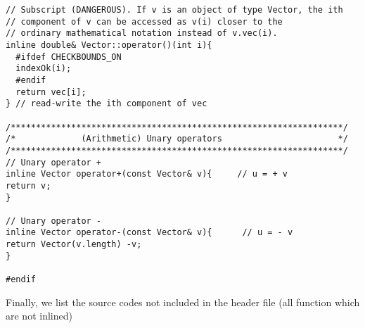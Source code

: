 \begin{lstlisting}[title={\url{http://folk.uio.no/mhjensen/compphys/programs/chapter03/cpp/Vector.h}}]
// Subscript (DANGEROUS). If v is an object of type Vector, the ith 
// component of v can be accessed as v(i) closer to the 
// ordinary mathematical notation instead of v.vec(i). 
inline double& Vector::operator()(int i){
  #ifdef CHECKBOUNDS_ON
  indexOk(i);
  #endif
  return vec[i];
} // read-write the ith component of vec

/******************************************************************/
/*             (Arithmetic) Unary operators                       */
/******************************************************************/
// Unary operator +
inline Vector operator+(const Vector& v){     // u = + v
return v;
}

// Unary operator -
inline Vector operator-(const Vector& v){      // u = - v
return Vector(v.length) -v;
}

#endif
\end{lstlisting}
Finally, we list the source codes not included in the header file (all function which are not inlined)
